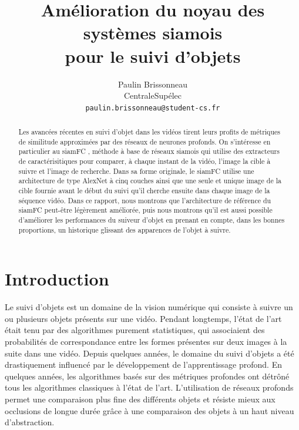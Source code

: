 \documentclass[10pt,twocolumn,letterpaper,french]{article}
\begin{document}
\title{Amélioration du noyau des systèmes siamois\\pour le suivi d'objets}

\author{Paulin Brissonneau\\
CentraleSupélec\\
{\tt\small paulin.brissonneau@student-cs.fr}}



\maketitle

\begin{abstract}

Les avancées récentes en suivi d'objet dans les vidéos tirent leurs profits de métriques de similitude approximées par des réseaux de neurones profonds. On s'intéresse en particulier au siamFC \cite{siamfc}, méthode à base de réseaux siamois qui utilise des extracteurs de caractérisitiques pour comparer, à chaque instant de la vidéo, l'image la cible à suivre et l'image de recherche. Dans sa forme originale, le siamFC utilise une architecture de type AlexNet à cinq couches ainsi que une seule et unique image de la cible fournie avant le début du suivi qu'il cherche ensuite dans chaque image de la séquence vidéo. Dans ce rapport, nous montrons que l'architecture de référence du siamFC peut-être légèrement améliorée, puis nous montrons qu'il est aussi possible d'améliorer les performances du suiveur d'objet en prenant en compte, dans les bonnes proportions, un historique glissant des apparences de l'objet à suivre.

\end{abstract}

\section*{Introduction}

Le suivi d'objets est un domaine de la vision numérique qui consiste à suivre un ou plusieurs objets présents sur une vidéo.
   Pendant longtemps, l'état de l'art était tenu par des algorithmes purement statistiques, qui associaient des probabilités de correspondance entre les formes présentes sur deux images à la suite dans une vidéo. Depuis quelques années, le domaine du suivi d'objets a été drastiquement influencé par le développement de l'apprentissage profond. En quelques années, les algorithmes basés sur des métriques profondes ont détrôné tous les algorithmes classiques à l'état de l'art. L'utilisation de réseaux profonds permet une comparaison plus fine des différents objets et résiste mieux aux occlusions de longue durée grâce à une comparaison des objets à un haut niveau d'abstraction. \\
   
\end{document}
